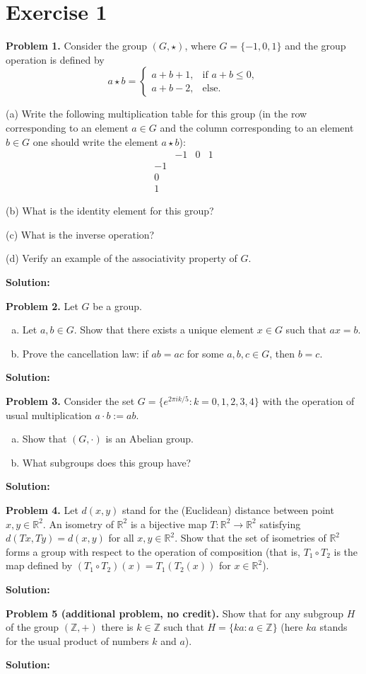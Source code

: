 \documentclass{article}
\begin{document}
\section*{Exercise 1}

\textbf{Problem 1.} Consider the group $(G,\star)$, where $G=\{-1,0,1\}$ and the group operation is defined by
\[
a \star b = \begin{cases}
a + b + 1, & \text{if } a + b \leq 0, \\
a + b - 2, & \text{else.}
\end{cases}
\]

(a) Write the following multiplication table for this group (in the row corresponding to an element $a \in G$ and the column corresponding to an element $b \in G$ one should write the element $a \star b$):
\[
\begin{array}{c|ccc}
& -1 & 0 & 1 \\
\hline
-1 & & & \\
0 & & & \\
1 & & & 
\end{array}
\]

(b) What is the identity element for this group?

(c) What is the inverse operation?

(d) Verify an example of the associativity property of $G$.

\textbf{Solution:}

\textbf{Problem 2.} Let $G$ be a group.
\begin{enumerate}[a)]
\item Let $a,b \in G$. Show that there exists a unique element $x \in G$ such that $ax=b$.
\item Prove the cancellation law: if $ab=ac$ for some $a,b,c \in G$, then $b=c$.
\end{enumerate}

\textbf{Solution:}

\textbf{Problem 3.} Consider the set $G=\{e^{2\pi i k/5} : k=0,1,2,3,4\}$ with the operation of usual multiplication $a \cdot b := ab$.
\begin{enumerate}[a)]
\item Show that $(G,\cdot)$ is an Abelian group.
\item What subgroups does this group have?
\end{enumerate}

\textbf{Solution:}

\textbf{Problem 4.} Let $d(x,y)$ stand for the (Euclidean) distance between point $x,y \in \mathbb{R}^2$. An isometry of $\mathbb{R}^2$ is a bijective map $T: \mathbb{R}^2 \to \mathbb{R}^2$ satisfying $d(Tx,Ty)=d(x,y)$ for all $x,y \in \mathbb{R}^2$. Show that the set of isometries of $\mathbb{R}^2$ forms a group with respect to the operation of composition (that is, $T_1 \circ T_2$ is the map defined by $(T_1 \circ T_2)(x)=T_1(T_2(x))$ for $x \in \mathbb{R}^2$).

\textbf{Solution:}

\textbf{Problem 5 (additional problem, no credit).} Show that for any subgroup $H$ of the group $(\mathbb{Z},+)$ there is $k \in \mathbb{Z}$ such that $H=\{ka : a \in \mathbb{Z}\}$ (here $ka$ stands for the usual product of numbers $k$ and $a$).

\textbf{Solution:}
\end{document}
